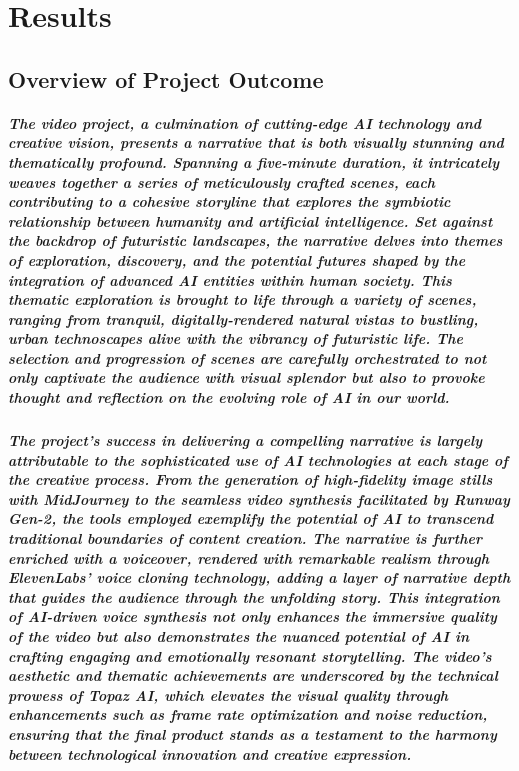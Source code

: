 \documentclass[11pt,a4paper,oneside]{report}
\begin{document}
\chapter{Results}
\label{results}
\section{Overview of Project Outcome}

\paragraph{The video project, a culmination of cutting-edge AI technology and creative vision, presents a narrative that is both visually stunning and thematically profound. Spanning a five-minute duration, it intricately weaves together a series of meticulously crafted scenes, each contributing to a cohesive storyline that explores the symbiotic relationship between humanity and artificial intelligence. Set against the backdrop of futuristic landscapes, the narrative delves into themes of exploration, discovery, and the potential futures shaped by the integration of advanced AI entities within human society. This thematic exploration is brought to life through a variety of scenes, ranging from tranquil, digitally-rendered natural vistas to bustling, urban technoscapes alive with the vibrancy of futuristic life. The selection and progression of scenes are carefully orchestrated to not only captivate the audience with visual splendor but also to provoke thought and reflection on the evolving role of AI in our world.}

\paragraph{The project's success in delivering a compelling narrative is largely attributable to the sophisticated use of AI technologies at each stage of the creative process. From the generation of high-fidelity image stills with MidJourney to the seamless video synthesis facilitated by Runway Gen-2, the tools employed exemplify the potential of AI to transcend traditional boundaries of content creation. The narrative is further enriched with a voiceover, rendered with remarkable realism through ElevenLabs' voice cloning technology, adding a layer of narrative depth that guides the audience through the unfolding story. This integration of AI-driven voice synthesis not only enhances the immersive quality of the video but also demonstrates the nuanced potential of AI in crafting engaging and emotionally resonant storytelling. The video's aesthetic and thematic achievements are underscored by the technical prowess of Topaz AI, which elevates the visual quality through enhancements such as frame rate optimization and noise reduction, ensuring that the final product stands as a testament to the harmony between technological innovation and creative expression.}
\end{document}
